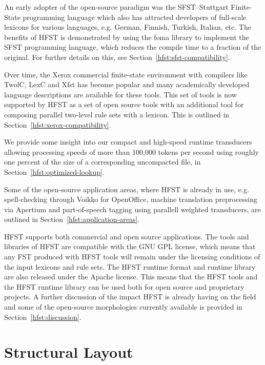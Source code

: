 \documentclass{llncs}
\begin{document}
An early adopter of the open-source paradigm was the SFST--Stuttgart Finite-State 
programming language which also has attracted developers of full-scale lexicons for 
various languages, e.g. German, Finnish, Turkish, Italian, etc. The benefits of HFST is 
demonstrated by using the foma library to implement the SFST programming language,
which reduces the compile time to a fraction of the original. For further details on this, 
see Section~\ref{hfst:sfst-compatibility}.

Over time, the Xerox commercial finite-state environment with compilers like TwolC, 
LexC and Xfst has become popular and many academically developed language 
descriptions are available for these tools. This set of tools is now supported by
HFST as a set of open source tools with an additional tool for composing parallel 
two-level rule sets with a lexicon. This is outlined in Section~\ref{hfst:xerox-compatibility}.

We provide some insight into our compact and high-speed runtime transducers allowing 
processing speeds of more than 100,000 tokens per second using roughly one percent of 
the size of a corresponding uncompacted file, in Section~\ref{hfst:optimized-lookup}. 

Some of the open-source application areas, where HFST is already in use, e.g. 
spell-checking through Voikko for OpenOffice, machine translation preprocessing via Apertium 
and part-of-speech tagging using parallell weighted transducers, are outlined in Section~\ref{hfst:application-areas}.

HFST supports both commercial and open source applications. The tools and libraries of HFST are
compatible with the GNU GPL license, which means that any FST produced with HFST tools will 
remain under the licensing conditions of the input lexicons and rule sets. The HFST runtime
format and runtime library are also released under the Apache license. This means that the
HFST tools and the HFST runtime library can be used both for open source and proprietary projects.
A further discussion of the impact HFST is already having on the field and some of the 
open-source morphologies currently available is provided in Section~\ref{hfst:discussion}.


\section{Structural Layout}\label{hfst:structural-layout}
\end{document}
